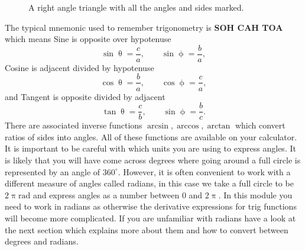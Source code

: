 \begin{figure}[ht]
    \centering
    \caption{A right angle triangle with all the angles and sides marked.}
    \label{fig: Trig definitions}
\end{figure}

The typical mnemonic used to remember trigonometry is \textbf{SOH CAH TOA} which means Sine is opposite over hypotenuse
\begin{equation*}
\sin\uptheta=\frac{c}{a}, \qquad \sin\upphi =\frac{b}{a},
\end{equation*}
Cosine is adjacent divided by hypotenuse
\begin{equation*}
\cos\uptheta=\frac{b}{a}, \qquad \cos\upphi =\frac{c}{a},
\end{equation*}
and Tangent is opposite divided by adjacent
\begin{equation*}
\tan\uptheta=\frac{c}{b}, \qquad \sin\upphi =\frac{b}{c}.
\end{equation*}
There are associated inverse functions $\arcsin,\arccos,\arctan$ which convert ratios of sides into angles. All of these functions are available on your calculator. \\

It is important to be careful with which units you are using to express angles. It is likely that you will have come across degrees where going around a full circle is represented by an angle of $360^{\circ}$. However, it is often convenient to work with a different measure of angles called radians, in this case we take a full circle to be $2\uppi\text{rad}$ and express angles as a number between $0$ and $2\uppi$. In this module you need to work in radians as otherwise the derivative expressions for trig functions will become more complicated. If you are unfamiliar with  radians have a look at the next section which explains more about them and how to convert between degrees and radians.

